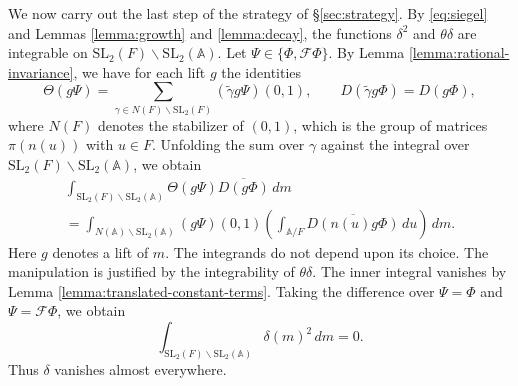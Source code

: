\documentclass[reqno]{amsart}
\theoremstyle{plain}
\theoremstyle{definition}
\theoremstyle{itplain}
\numberwithin{equation}{section}
\numberwithin{theorem}{section}
\begin{document}
We now carry out the last step of the strategy of \S\ref{sec:strategy}.  By \eqref{eq:siegel} and Lemmas \ref{lemma:growth} and \ref{lemma:decay}, the functions $\delta^2$ and $\theta \delta$ are integrable on $\mathrm{SL}_2(F) \backslash \mathrm{SL}_2(\mathbb{A})$.  Let $\Psi \in \{\Phi, \mathcal{F} \Phi\}$.  By Lemma \ref{lemma:rational-invariance}, we have for each lift $g$ the identities
\begin{equation*}
  \Theta(g \Psi) = \sum_{\gamma \in N(F) \backslash \mathrm{SL}_2(F)} (\tilde{\gamma} g \Psi)(0, 1),
  \qquad
  D(\tilde{\gamma} g \Phi) = D(g \Phi),
\end{equation*}
where $N(F)$ denotes the stabilizer of $(0, 1)$, which is the group of matrices $\pi(n(u))$ with $u \in F$.  Unfolding the sum over $\gamma$ against the integral over $\mathrm{SL}_2(F) \backslash \mathrm{SL}_2(\mathbb{A})$, we obtain
\begin{multline*}
  \int_{\mathrm{SL}_2(F) \backslash \mathrm{SL}_2(\mathbb{A})} \Theta(g \Psi) \overline{D(g \Phi)} \, d m
  \\
  =
  \int_{N(\mathbb{A}) \backslash \mathrm{SL}_2(\mathbb{A})} (g \Psi)(0, 1) \left( \int_{\mathbb{A} / F} \overline{D(n(u) g \Phi)} \, d u \right) \, d m.
\end{multline*}
Here $g$ denotes a lift of $m$.  The integrands do not depend upon its choice.  The manipulation is justified by the integrability of $\theta \delta$.  The inner integral vanishes by Lemma \ref{lemma:translated-constant-terms}.  Taking the difference over $\Psi = \Phi$ and $\Psi = \mathcal{F} \Phi$, we obtain
\begin{equation*}
  \int_{\mathrm{SL}_2(F) \backslash \mathrm{SL}_2(\mathbb{A})} \delta(m)^2 \, d m = 0.
\end{equation*}
Thus $\delta$ vanishes almost everywhere.
\end{document}
